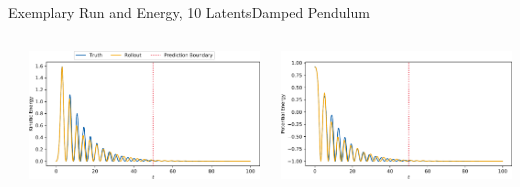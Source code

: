 \documentclass[
	aspectratio=43,
	color={accentcolor=1c},
	logo=false,
	colorframetitle=true,
]{tudabeamer}
\begin{document}
\begin{frame}[c]{Exemplary Run and Energy, 10 Latents}{Damped Pendulum}
\begin{columns}
\begin{column}{0.333\linewidth}
\begin{center}
						\end{center}
					\end{column}
					\begin{column}{0.333\linewidth}
						\begin{center}
							\includegraphics[width=\linewidth]{figures/experiments/pendulum-damped/energy-R110-N0-kinetic.pdf}
						\end{center}
					\end{column}
					\begin{column}{0.333\linewidth}
						\begin{center}
							\includegraphics[width=\linewidth]{figures/experiments/pendulum-damped/energy-R110-N0-potential.pdf}
						\end{center}
					\end{column}
				\end{columns}
			\end{frame}
\end{document}

